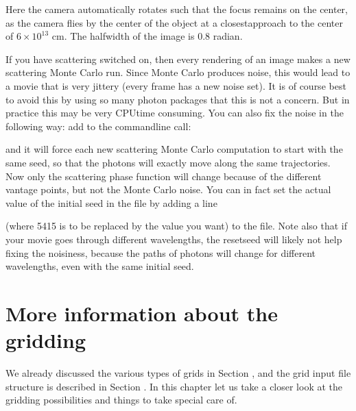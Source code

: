 \documentclass[letterpaper,10pt,english]{sphinxmanual}
\begin{document}
Here the camera automatically rotates such that the focus remains on the center,
as the camera flies by the center of the object at a closest\sphinxhyphen{}approach to the
center of \(6\times 10^{13}\) cm. The half\sphinxhyphen{}width of the image is 0.8 radian.

 If you have scattering switched on, then every rendering of an
image makes a new scattering Monte Carlo run. Since Monte Carlo produces noise,
this would lead to a movie that is very jittery (every frame has a new noise
set). It is of course best to avoid this by using so many photon packages that
this is not a concern. But in practice this may be very CPU\sphinxhyphen{}time consuming. You
can also fix the noise in the following way: add  to the
command\sphinxhyphen{}line call:

\begin{sphinxVerbatim}[commandchars=\\\{\}]
  
\end{sphinxVerbatim}

and it will force each new scattering Monte Carlo computation to start with the
same seed, so that the photons will exactly move along the same
trajectories. Now only the scattering phase function will change because of the
different vantage points, but not the Monte Carlo noise. You can in fact set the
actual value of the initial seed in the  file by adding a line

\begin{sphinxVerbatim}[commandchars=\\\{\}]
  
\end{sphinxVerbatim}

(where \sphinxhyphen{}5415 is to be replaced by the value you want) to the 
file. Note also that if your movie goes through different wavelengths, the
resetseed will likely not help fixing the noisiness, because the paths of
photons will change for different wavelengths, even with the same initial seed.


\chapter{More information about the gridding}
\label{\detokenize{gridding:more-information-about-the-gridding}}\label{\detokenize{gridding:chap-gridding}}\label{\detokenize{gridding::doc}}
We already discussed the various types of grids in Section
{\hyperref[\detokenize{basicstructure:sec-spatial-grid}]{}}, and the grid input file structure is described in
Section {\hyperref[\detokenize{inputoutputfiles:sec-grid-input}]{}}. In this chapter let us take a closer look
at the gridding possibilities and things to take special care of.
\end{document}
